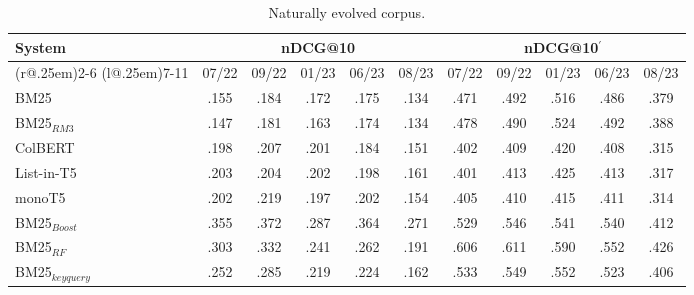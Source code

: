 \begin{table}[t]
\small
\centering
\renewcommand{\tabcolsep}{3.2pt}
\caption{Naturally evolved corpus.}
\label{tab:table-results}

\begin{tabular}{@{}l@{}cccccccccc@{}}
    \toprule
    \bfseries System & \multicolumn{5}{c}{\bfseries nDCG@10} & \multicolumn{5}{c}{\bfseries nDCG@10$^{'}$}\\
    \cmidrule(r@{.25em}){2-6}
    \cmidrule(l@{.25em}){7-11}
    
    & 07/22 & 09/22 & 01/23 & 06/23 & 08/23 & 07/22 & 09/22 & 01/23 & 06/23 & 08/23\\
    
    \midrule

    BM25 & .155 & .184 & .172 & .175 & .134 & .471 & .492 & .516 & .486 & .379 \\
    BM25$_{RM3}$ & .147 & .181 & .163 & .174 & .134 & .478 & .490 & .524 & .492 & .388 \\
    ColBERT & .198 & .207 & .201 & .184 & .151 & .402 & .409 & .420 & .408 & .315 \\
    List-in-T5 & .203 & .204 & .202 & .198 & .161 & .401 & .413 & .425 & .413 & .317 \\
    monoT5 & .202 & .219 & .197 & .202 & .154 & .405 & .410 & .415 & .411 & .314 \\
    
    \midrule
    
    BM25$_{Boost}$ & .355 & .372 & .287 & .364 & .271 & .529 & .546 & .541 & .540 & .412 \\
    BM25$_{RF}$ & .303 & .332 & .241 & .262 & .191 & .606 & .611 & .590 & .552 & .426 \\
    BM25$_{keyquery}$ & .252 & .285 & .219 & .224 & .162 & .533 & .549 & .552 & .523 & .406 \\

\bottomrule
\end{tabular}
\end{table}
